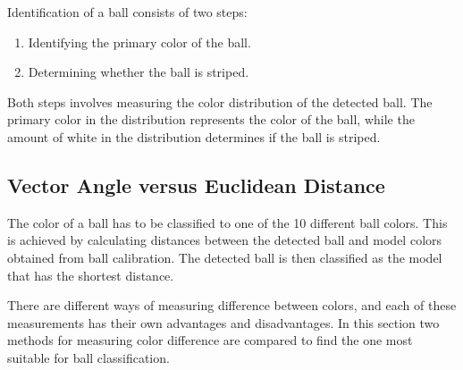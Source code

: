 Identification of a ball consists of two steps:
\begin{enumerate}
  \item Identifying the primary color of the ball.
  \item Determining whether the ball is striped.
\end{enumerate}
Both steps involves measuring the color distribution of the detected ball. The primary color in the distribution represents the color of the ball, while the amount of white in the distribution determines if the ball is striped.

\subsection{Vector Angle versus Euclidean Distance}
The color of a ball has to be classified to one of the 10 different ball colors. This is achieved by calculating distances between the detected ball and model colors obtained from ball calibration. The detected ball is then classified as the model that has the shortest distance.

There are different ways of measuring difference between colors, and each of these measurements has their own advantages and disadvantages. In this section two methods for measuring color difference are compared to find the one most suitable for ball classification.

